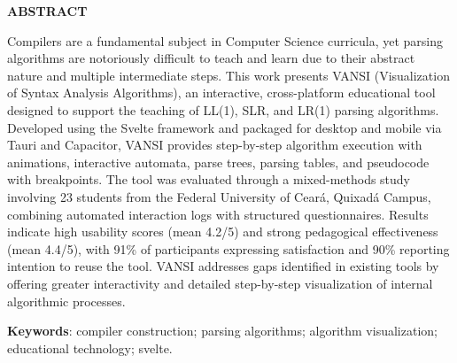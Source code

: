 \newpage

\thispagestyle{empty}

\begin{center}
    \textbf{ABSTRACT}
\end{center}

\vspace{0.5cm}

\noindent Compilers are a fundamental subject in Computer Science curricula, yet parsing algorithms are notoriously difficult to teach and learn due to their abstract nature and multiple intermediate steps. This work presents VANSI (Visualization of Syntax Analysis Algorithms), an interactive, cross-platform educational tool designed to support the teaching of LL(1), SLR, and LR(1) parsing algorithms. Developed using the Svelte framework and packaged for desktop and mobile via Tauri and Capacitor, VANSI provides step-by-step algorithm execution with animations, interactive automata, parse trees, parsing tables, and pseudocode with breakpoints. The tool was evaluated through a mixed-methods study involving 23 students from the Federal University of Ceará, Quixadá Campus, combining automated interaction logs with structured questionnaires. Results indicate high usability scores (mean 4.2/5) and strong pedagogical effectiveness (mean 4.4/5), with 91\% of participants expressing satisfaction and 90\% reporting intention to reuse the tool. VANSI addresses gaps identified in existing tools by offering greater interactivity and detailed step-by-step visualization of internal algorithmic processes.

\vspace{0.5cm}

\noindent\textbf{Keywords}: compiler construction; parsing algorithms; algorithm visualization; educational technology; svelte.
